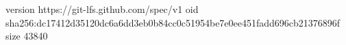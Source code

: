 version https://git-lfs.github.com/spec/v1
oid sha256:dc17412d35120dc6a6dd3eb0b84cc0c51954be7e0ee451fadd696cb21376896f
size 43840

